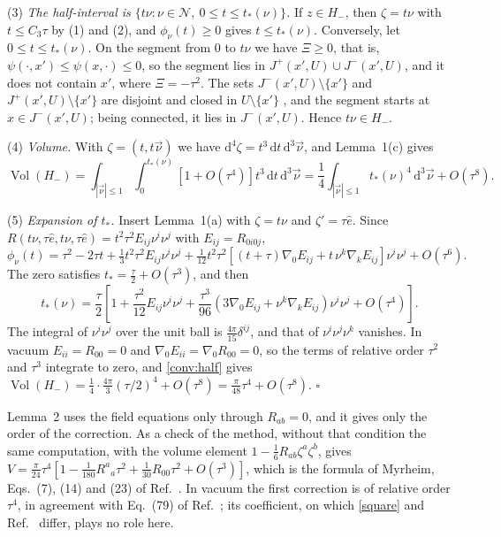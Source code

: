 (3) \emph{The half-interval is
$\{t\nu:\nu\in\mathcal N,\ 0\le t\le t_*(\nu)\}$.} If $z\in H_-$, then
$\zeta=t\nu$ with $t\le C_3\tau$ by (1) and (2), and $\phi_\nu(t)\ge0$ gives
$t\le t_*(\nu)$. Conversely, let $0\le t\le t_*(\nu)$. On the segment from
$0$ to $t\nu$ we have $\Xi\ge0$, that is,
$\psi(\cdot,x')\le\psi(x,\cdot)\le0$, so the segment lies in
$J^+(x',U)\cup J^-(x',U)$, and it does not contain $x'$, where
$\Xi=-\tau^2$. The sets $J^-(x',U)\setminus\{x'\}$ and
$J^+(x',U)\setminus\{x'\}$ are disjoint and closed in $U\setminus\{x'\}$
\cite[Lemma~14.2]{oneill}, and the segment starts at $x\in J^-(x',U)$;
being connected, it lies in $J^-(x',U)$. Hence $t\nu\in H_-$.

(4) \emph{Volume.} With $\zeta=(t,t\vec\nu)$ we have
$\mathrm d^4\zeta=t^3\,\mathrm dt\,\mathrm d^3\vec\nu$, and Lemma~1(c) gives
\begin{equation}
 \operatorname{Vol}(H_-)=\int_{|\vec\nu|\le1}\int_0^{t_*(\nu)}
 \left[1+O(\tau^4)\right]t^3\,\mathrm dt\,\mathrm d^3\vec\nu
 =\frac14\int_{|\vec\nu|\le1}t_*(\nu)^4\,\mathrm d^3\vec\nu+O(\tau^8).
 \label{conv:half}
\end{equation}

(5) \emph{Expansion of $t_*$.} Insert Lemma~1(a) with $\zeta=t\nu$ and
$\zeta'=\tau\hat e$. Since
$R(t\nu,\tau\hat e,t\nu,\tau\hat e)=t^2\tau^2E_{ij}\nu^i\nu^j$ with
$E_{ij}=R_{0i0j}$,
\begin{equation}
 \phi_\nu(t)=\tau^2-2\tau t+\tfrac13t^2\tau^2E_{ij}\nu^i\nu^j
 +\tfrac1{12}t^2\tau^2\left[(t+\tau)\nabla_0E_{ij}
 +t\,\nu^k\nabla_kE_{ij}\right]\nu^i\nu^j+O(\tau^6).
\end{equation}
The zero satisfies $t_*=\tfrac\tau2+O(\tau^3)$, and then
\begin{equation}
 t_*(\nu)=\frac\tau2\left[1+\frac{\tau^2}{12}E_{ij}\nu^i\nu^j
 +\frac{\tau^3}{96}\left(3\nabla_0E_{ij}+\nu^k\nabla_kE_{ij}\right)
 \nu^i\nu^j+O(\tau^4)\right].
\end{equation}
The integral of $\nu^i\nu^j$ over the unit ball is
$\tfrac{4\pi}{15}\delta^{ij}$, and that of $\nu^i\nu^j\nu^k$ vanishes. In
vacuum $E_{ii}=R_{00}=0$ and $\nabla_0E_{ii}=\nabla_0R_{00}=0$, so the terms
of relative order $\tau^2$ and $\tau^3$ integrate to zero, and
\eqref{conv:half} gives
$\operatorname{Vol}(H_-)=\tfrac14\cdot\tfrac{4\pi}3(\tau/2)^4+O(\tau^8)
=\tfrac{\pi}{48}\tau^4+O(\tau^8)$. \hfill$\square$

\medskip
Lemma~2 uses the field equations only through $R_{ab}=0$, and it gives only
the order of the correction. As a check of the method, without that
condition the same computation, with the volume element
$1-\tfrac16R_{ab}\zeta^a\zeta^b$, gives
$V=\tfrac{\pi}{24}\tau^4[1-\tfrac1{180}R^a{}_a\tau^2+\tfrac1{30}R_{00}\tau^2
+O(\tau^3)]$, which is the formula of Myrheim, Eqs.~(7), (14) and (23) of
Ref.~\cite{gibbons}. In vacuum the first correction is of relative order
$\tau^4$, in agreement with Eq.~(79) of Ref.~\cite{wang}; its coefficient, on
which \eqref{square} and Ref.~\cite{wang} differ, plays no role here.

